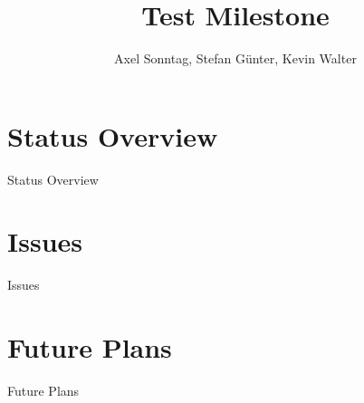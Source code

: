 \documentclass[compress,english]{beamer}
\title{Test Milestone}
\author{Axel Sonntag, Stefan Günter, Kevin Walter}
\institute{Hochschule Aalen}
\begin{document}
\renewcommand{\theFancyVerbLine}{
  \sffamily\textcolor[rgb]{0.5,0.5,0.5}{\scriptsize\arabic{FancyVerbLine}}}

  

\begin{frame}[plain]
  \titlepage
\end{frame}





\section{Status Overview}
\begin{frame}[fragile,c]
\begin{block}{Status Overview}
  
\end{block}
\end{frame}

\section{Issues}
\begin{frame}[fragile,c]
\begin{block}{Issues}
  
\end{block}
\end{frame}

\section{Future Plans}
\begin{frame}[fragile,c]
\begin{block}{Future Plans}
  
\end{block}
\end{frame}
\end{document}
